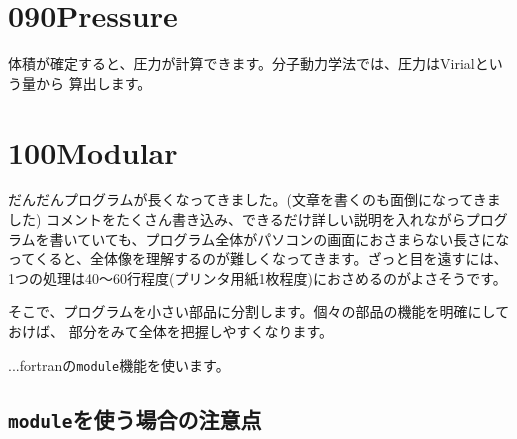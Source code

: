 \documentclass[a4,10pt]{article}
\begin{document}
\section{090Pressure}

体積が確定すると、圧力が計算できます。分子動力学法では、圧力はVirialという量から
算出します。


\section{100Modular}

だんだんプログラムが長くなってきました。(文章を書くのも面倒になってきました)
コメントをたくさん書き込み、できるだけ詳しい説明を入れながらプログラムを書いていても、プログラム全体がパソコンの画面におさまらない長さになってくると、全体像を理解するのが難しくなってきます。ざっと目を遠すには、1つの処理は40〜60行程度(プリンタ用紙1枚程度)におさめるのがよさそうです。

そこで、プログラムを小さい部品に分割します。個々の部品の機能を明確にしておけば、
部分をみて全体を把握しやすくなります。

...fortranの{\tt module}機能を使います。

\subsection{{\tt module}を使う場合の注意点}
\end{document}
